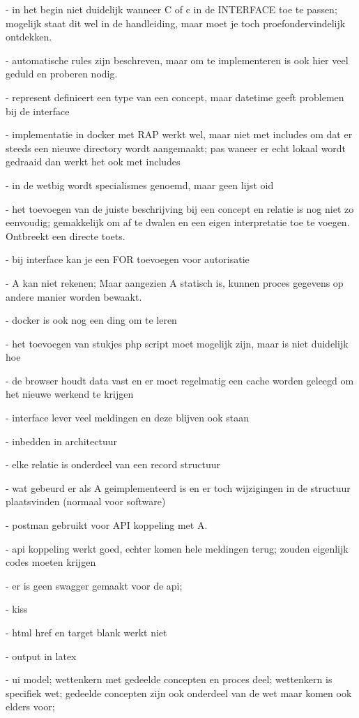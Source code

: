 - in het begin niet duidelijk wanneer C of c in de INTERFACE toe te passen; mogelijk staat dit wel in de handleiding, maar moet je toch proefondervindelijk ontdekken.

- automatische rules zijn beschreven, maar om te implementeren is ook hier veel geduld en proberen nodig. 

- represent definieert een type van een concept, maar datetime geeft problemen bij de interface

- implementatie in docker met RAP werkt wel, maar niet met includes om dat er steeds een nieuwe directory wordt aangemaakt; pas waneer er echt lokaal wordt gedraaid dan werkt het ook met includes

- in de wetbig wordt specialismes genoemd, maar geen lijst oid

- het toevoegen van de juiste beschrijving bij een concept en relatie is nog niet zo eenvoudig; gemakkelijk om af te dwalen en een eigen interpretatie toe te voegen. Ontbreekt een directe toets.

- bij interface kan je een FOR toevoegen voor autorisatie

- A kan niet rekenen; Maar aangezien A statisch is, kunnen proces gegevens op andere manier worden bewaakt.

- docker is ook nog een ding om te leren

- het toevoegen van stukjes php script moet mogelijk zijn, maar is niet duidelijk hoe

- de browser houdt data vast en er moet regelmatig een cache worden geleegd om het nieuwe werkend te krijgen

- interface lever veel meldingen en deze blijven ook staan

- inbedden in architectuur 

- elke relatie is onderdeel van een record structuur

- wat gebeurd er als A geimplementeerd is en er toch wijzigingen in de structuur plaatsvinden (normaal voor software)

- postman gebruikt voor API koppeling met A. 

- api koppeling werkt goed, echter komen hele meldingen terug; zouden eigenlijk codes moeten krijgen 

- er is geen swagger gemaakt voor de api; 

- kiss

- html href en target blank werkt niet

- output in latex 

- ui model; wettenkern met gedeelde concepten en proces deel; wettenkern is specifiek wet; gedeelde concepten zijn ook onderdeel van de wet maar komen ook elders voor;


